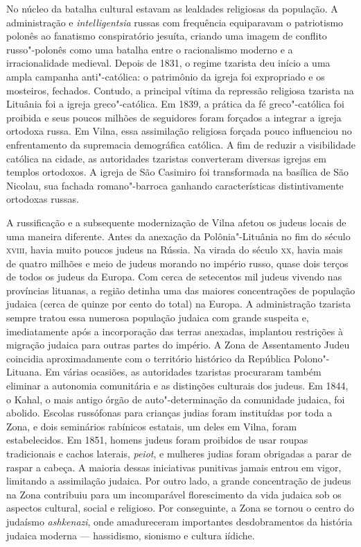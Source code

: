 No núcleo da batalha cultural estavam as lealdades religiosas da
população. A administração e \textit{intelligentsia} russas com frequência
equiparavam o patriotismo polonês ao fanatismo conspiratório jesuíta,
criando uma imagem de conflito russo"-polonês como uma batalha entre o
racionalismo moderno e a irracionalidade medieval. Depois de 1831, o
regime tzarista deu início a uma ampla campanha anti"-católica: o
patrimônio da igreja foi expropriado e os mosteiros, fechados. Contudo,
a principal vítima da repressão religiosa tzarista na Lituânia foi a
igreja greco"-católica. Em 1839, a prática da fé greco"-católica foi
proibida e seus poucos milhões de seguidores foram forçados a integrar a
igreja ortodoxa russa. Em Vilna, essa assimilação religiosa forçada
pouco influenciou no enfrentamento da supremacia demográfica católica. A
fim de reduzir a visibilidade católica na cidade, as autoridades
tzaristas converteram diversas igrejas em templos ortodoxos. A igreja de
São Casimiro foi transformada na basílica de São Nicolau, sua fachada
romano"-barroca ganhando características distintivamente ortodoxas
russas.

%

A russificação e a subsequente modernização de Vilna afetou os judeus
locais de uma maneira diferente. Antes da anexação da Polônia"-Lituânia
no fim do século \textsc{xviii}, havia muito poucos judeus na Rússia. Na virada do
século \textsc{xx}, havia mais de quatro milhões e meio de judeus morando no
império russo, quase dois terços de todos os judeus da Europa. Com cerca
de setecentos mil judeus vivendo nas províncias lituanas, a região
detinha uma das maiores concentrações de população judaica (cerca de
quinze por cento do total) na Europa. A administração tzarista sempre
tratou essa numerosa população judaica com grande suspeita e,
imediatamente após a incorporação das terras anexadas, implantou
restrições à migração judaica para outras partes do império. A Zona de
Assentamento Judeu coincidia aproximadamente com o território histórico
da República Polono"-Lituana. Em várias ocasiões, as autoridades
tzaristas procuraram também eliminar a autonomia comunitária e as
distinções culturais dos judeus. Em 1844, o Kahal, o mais antigo órgão
de auto"-determinação da comunidade judaica, foi abolido. Escolas
russófonas para crianças judias foram instituídas por toda a Zona, e
dois seminários rabínicos estatais, um deles em Vilna, foram
estabelecidos. Em 1851, homens judeus foram proibidos de usar roupas
tradicionais e cachos laterais, \textit{peiot}, e mulheres judias foram
obrigadas a parar de raspar a cabeça. A maioria dessas iniciativas
punitivas jamais entrou em vigor, limitando a assimilação judaica. Por
outro lado, a grande concentração de judeus na Zona contribuiu para um
incomparável florescimento da vida judaica sob os aspectos cultural,
social e religioso. Por conseguinte, a Zona se tornou o centro do
judaísmo \textit{ashkenazi}, onde amadureceram importantes desdobramentos da
história judaica moderna --- hassidismo, sionismo e cultura iídiche.

